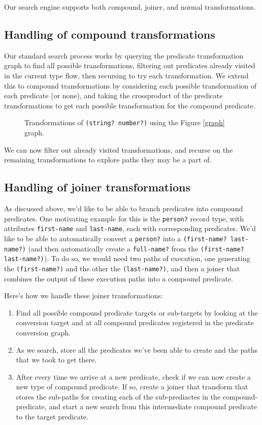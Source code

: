 \documentclass[letterpaper]{article}
\begin{document}
Our search engine supports both compound, joiner, and normal transformations.

\subsection{Handling of compound transformations}

Our standard search process works by querying the predicate transformation graph to find all possible transformations, filtering out predicates already visited in the current type flow, then recursing to try each transformation.  We extend this to compound transformations by considering each possible transformation of each predicate (or none), and taking the crossproduct of the predicate transformations to get each possible transformation for the compound predicate.

\begin{figure}[h!]
\centering

\caption{Transformations of \texttt{(string? number?)} using the Figure \ref{graph} graph.}
\label{crossproduct}
\end{figure}

We can now filter out already visited transformations, and recurse on the remaining transformations to explore paths they may be a part of.

\subsection{Handling of joiner transformations}

As discussed above, we'd like to be able to branch predicates into compound predicates.  One motivating example for this is the \texttt{person?} record type, with attributes \texttt{first-name} and \texttt{last-name}, each with corresponding predicates.  We'd like to be able to automatically convert a \texttt{person?} into a \texttt{(first-name? last-name?)} (and then automatically create a \texttt{full-name?} from the \texttt{(first-name? last-name?)}). To do so, we would need two paths of execution, one generating the \texttt{(first-name?)} and the other the \texttt{(last-name?)}, and then a joiner that combines the output of these execution paths into a compound predicate.

Here's how we handle these joiner transformations:
\begin{enumerate}
  \item Find all possible compound predicate targets or sub-targets by looking at the conversion target and at all compound predicates registered in the predicate conversion graph.
  \item As we search, store all the predicates we've been able to create and the paths that we took to get there.
  \item After every time we arrive at a new predicate, check if we can now create a new type of compound predicate. If so, create a joiner that transform that stores the sub-paths for creating each of the sub-prediactes in the compound-predicate, and start a new search from this intermediate compound predicate to the target predicate.
\end{enumerate}
\end{document}
